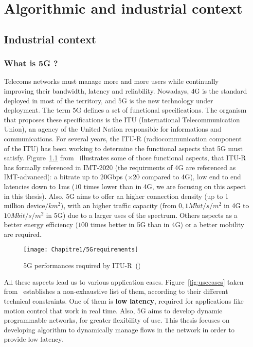 
\chapter{Algorithmic and industrial context}
\label{chap:context}
\minitoc

\section{Industrial context}
\subsection{What is 5G ?}



Telecoms networks must manage more and more users while continually improving their bandwidth, latency and reliability. Nowadays, 4G is the standard deployed in most of the territory, and 5G is the new technology under deployment. The term 5G defines a set of functional specifications. The organism that proposes these specifications is the ITU (International Telecommunication Union), an agency of the United Nation responsible for informations and communications. For several years, the ITU-R (radiocommunication component of the ITU) has been working to determine the functional aspects that 5G must satisfy. Figure~\ref{fig:5gperf} from~\cite{dahlman20185g} illustrates some of those functional aspects, that ITU-R has formally referenced in IMT-2020 (the requirments of 4G are referenced as IMT-advanced): a bitrate up to 20Gbps ($\times 20$ compared to 4G), low end to end latencies down to 1ms ($10$ times lower than in 4G, we are focusing on this aspect in this thesis).
Also, 5G aims to offer an higher connection density (up to 1 million device$/km^2$), with an higher traffic capacity (from $0,1 Mbit/s/m^2$ in 4G to $10 Mbit/s/m^2$ in 5G) due to a larger uses of the spectrum. Others aspects as a better energy efficiency ($100$ times better in 5G than in 4G) or a better mobility are required. 

  \begin{figure}[h]
      \begin{center}
      \texttt{[image: Chapitre1/5Grequirements]}
      \end{center}
      \caption{5G performances required by ITU-R~(\cite{dahlman20185g})}\label{fig:5gperf}
      \end{figure}

All these aspects lead us to various application cases. Figure~\ref{fig:usecases} taken from~\cite{5GACIA} establishes a non-exhaustive list of them, according to their different technical constraints. One of them is \textbf{low latency}, required for applications like motion control that work in real time. Also,  5G aims to develop dynamic programmable networks, for greater flexibility of use. This thesis focuses on developing algorithm to dynamically manage flows in the network in order to provide low latency.

